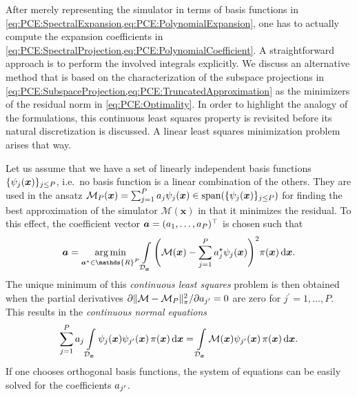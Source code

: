 After merely representing the simulator in terms of basis functions in \cref{eq:PCE:SpectralExpansion,eq:PCE:PolynomialExpansion},
one has to actually compute the expansion coefficients in \cref{eq:PCE:SpectralProjection,eq:PCE:PolynomialCoefficient}.
A straightforward approach is to perform the involved integrals explicitly.
We discuss an alternative method that is based on the characterization of the subspace projections
in \cref{eq:PCE:SubspaceProjection,eq:PCE:TruncatedApproximation} as the minimizers of the residual norm in \cref{eq:PCE:Optimality}.
In order to highlight the analogy of the formulations, this continuous least squares property is revisited before its natural discretization is discussed.
A linear least squares minimization problem \cite{Statistics:Bjorck2004} arises that way.
\par %
Let us assume that we have a set of linearly independent basis functions \(\{\psi_{j}(\bm{x})\}_{j \leq P}\), i.e.\ no basis function is a linear combination of the others.
They are used in the ansatz \(\mathcal{M}_P(\bm{x}) = \sum_{j=1}^P a_{j} \psi_{j}(\bm{x}) \in \mathrm{span}(\{\psi_{j}(\bm{x})\}_{j \leq P})\)
for finding the best approximation of the simulator \(\mathcal{M}(\bm{x})\) in that it minimizes the residual.
To this effect, the coefficient vector \(\bm{a} = (a_1,\ldots,a_P)^\top\) is chosen such that
\begin{equation} \label{eq:PCE:ContinuousLeastSquares}
  \bm{\coeffM} = \operatorname*{arg\,min}_{\bm{\coeffM}^\star \in \mathds{R}^P}
  \int\limits_{\mathcal{D}_{\bm{x}}} \Bigg( \mathcal{M}(\bm{x}) - \sum_{j=1}^P \coeffM_{j}^\star \basisU_{j}(\bm{x}) \Bigg)^2 \pi(\bm{x}) \, \mathrm{d} \bm{x}.
\end{equation}
The unique minimum of this \emph{continuous least squares} problem is then obtained when the partial derivatives
\(\partial \lVert \mathcal{M} - \mathcal{M}_P \rVert_\pi^2 / \partial a_{j^\prime} = 0\) are zero for \(j^\prime = 1,\ldots,P\).
This results in the \emph{continuous normal equations}
\begin{equation} \label{eq:PCE:ContinuousNormalEquations}
  \sum_{j=1}^P a_{j} \int\limits_{\mathcal{D}_{\bm{x}}} \psi_{j}(\bm{x}) \psi_{j^\prime}(\bm{x}) \, \pi(\bm{x}) \, \mathrm{d} \bm{x}
  = \int\limits_{\mathcal{D}_{\bm{x}}} \mathcal{M}(\bm{x}) \psi_{j^\prime}(\bm{x}) \, \pi(\bm{x}) \, \mathrm{d} \bm{x}.
\end{equation}
If one chooses orthogonal basis functions, the system of equations can be easily solved for the coefficients \(a_{j^\prime}\).
